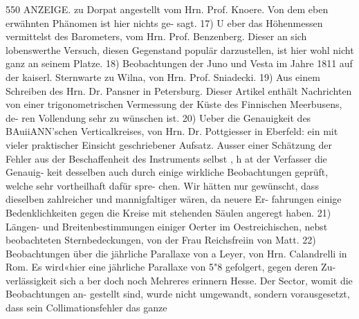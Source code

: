 \documentclass[12pt,a4paper]{article}
\begin{document}
\newpage
550 ANZEIGE.\newline
zu Dorpat angestellt vom Hrn. Prof. Knoere. Von dem eben erwähnten Phänomen ist hier nichts ge-\newline
sagt. 17) U eber das Höhenmessen vermittelst des Barometers, vom Hrn. Prof. Benzenberg. Dieser an\newline
sich lobenswerthe Versuch, diesen Gegenstand populär darzustellen, ist hier wohl nicht ganz an seinem\newline
Platze. 18) Beobachtungen der Juno und Vesta im Jahre 1811 auf der kaiserl. Sternwarte zu Wilna,\newline
von Hrn. Prof. Sniadecki. 19) Aus einem Schreiben des Hrn. Dr. Pansner in Petersburg. Dieser Artikel\newline
enthält Nachrichten von einer trigonometrischen Vermessung der Küste des Finnischen Meerbusens, de-\newline
ren Vollendung sehr zu wünschen ist. 20) Ueber die Genauigkeit des BAuiiANN'schen Verticalkreises,\newline
von Hrn. Dr. Pottgiesser in Eberfeld: ein mit vieler praktischer Einsicht geschriebener Aufsatz. Ausser\newline
einer Schätzung der Fehler aus der Beschaffenheit des Instruments selbst , h at der Verfasser die Genauig-\newline
keit desselben auch durch einige wirkliche Beobachtungen geprüft, welche sehr vortheilhaft dafür spre-\newline
chen. Wir hätten nur gewünscht, dass dieselben zahlreicher und mannigfaltiger wären, da neuere Er-\newline
fahrungen einige Bedenklichkeiten gegen die Kreise mit stehenden Säulen angeregt haben. 21) Längen-\newline
und Breitenbestimmungen einiger Oerter im Oestreichischen, nebst beobachteten Sternbedeckungen,\newline
von der Frau Reichsfreiin von Matt. 22) Beobachtungen über die jährliche Parallaxe von a Leyer, von\newline
Hrn. Calandrelli in Rom. Es wird«hier eine jährliche Parallaxe von 5"8 gefolgert, gegen deren Zu-\newline
verlässigkeit sich a ber doch noch Mehreres erinnern Hesse. Der Sector, womit die Beobachtungen an-\newline
gestellt sind, wurde nicht umgewandt, sondern vorausgesetzt, dass sein Collimationsfehler das ganze\newline
\end{document}
